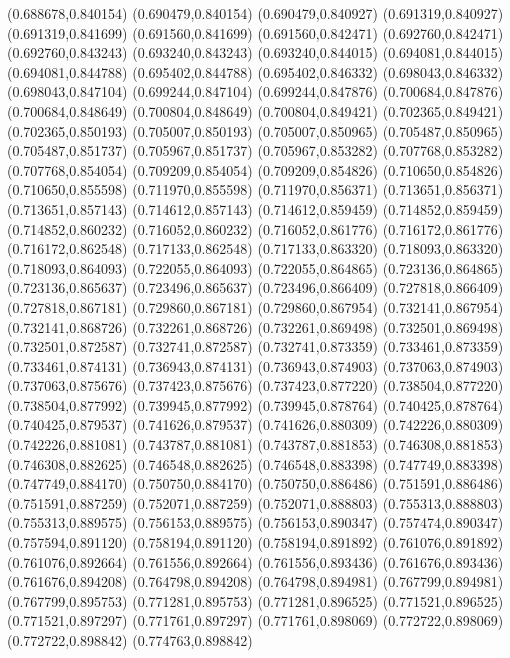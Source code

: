 (0.688678,0.840154)
(0.690479,0.840154)
(0.690479,0.840927)
(0.691319,0.840927)
(0.691319,0.841699)
(0.691560,0.841699)
(0.691560,0.842471)
(0.692760,0.842471)
(0.692760,0.843243)
(0.693240,0.843243)
(0.693240,0.844015)
(0.694081,0.844015)
(0.694081,0.844788)
(0.695402,0.844788)
(0.695402,0.846332)
(0.698043,0.846332)
(0.698043,0.847104)
(0.699244,0.847104)
(0.699244,0.847876)
(0.700684,0.847876)
(0.700684,0.848649)
(0.700804,0.848649)
(0.700804,0.849421)
(0.702365,0.849421)
(0.702365,0.850193)
(0.705007,0.850193)
(0.705007,0.850965)
(0.705487,0.850965)
(0.705487,0.851737)
(0.705967,0.851737)
(0.705967,0.853282)
(0.707768,0.853282)
(0.707768,0.854054)
(0.709209,0.854054)
(0.709209,0.854826)
(0.710650,0.854826)
(0.710650,0.855598)
(0.711970,0.855598)
(0.711970,0.856371)
(0.713651,0.856371)
(0.713651,0.857143)
(0.714612,0.857143)
(0.714612,0.859459)
(0.714852,0.859459)
(0.714852,0.860232)
(0.716052,0.860232)
(0.716052,0.861776)
(0.716172,0.861776)
(0.716172,0.862548)
(0.717133,0.862548)
(0.717133,0.863320)
(0.718093,0.863320)
(0.718093,0.864093)
(0.722055,0.864093)
(0.722055,0.864865)
(0.723136,0.864865)
(0.723136,0.865637)
(0.723496,0.865637)
(0.723496,0.866409)
(0.727818,0.866409)
(0.727818,0.867181)
(0.729860,0.867181)
(0.729860,0.867954)
(0.732141,0.867954)
(0.732141,0.868726)
(0.732261,0.868726)
(0.732261,0.869498)
(0.732501,0.869498)
(0.732501,0.872587)
(0.732741,0.872587)
(0.732741,0.873359)
(0.733461,0.873359)
(0.733461,0.874131)
(0.736943,0.874131)
(0.736943,0.874903)
(0.737063,0.874903)
(0.737063,0.875676)
(0.737423,0.875676)
(0.737423,0.877220)
(0.738504,0.877220)
(0.738504,0.877992)
(0.739945,0.877992)
(0.739945,0.878764)
(0.740425,0.878764)
(0.740425,0.879537)
(0.741626,0.879537)
(0.741626,0.880309)
(0.742226,0.880309)
(0.742226,0.881081)
(0.743787,0.881081)
(0.743787,0.881853)
(0.746308,0.881853)
(0.746308,0.882625)
(0.746548,0.882625)
(0.746548,0.883398)
(0.747749,0.883398)
(0.747749,0.884170)
(0.750750,0.884170)
(0.750750,0.886486)
(0.751591,0.886486)
(0.751591,0.887259)
(0.752071,0.887259)
(0.752071,0.888803)
(0.755313,0.888803)
(0.755313,0.889575)
(0.756153,0.889575)
(0.756153,0.890347)
(0.757474,0.890347)
(0.757594,0.891120)
(0.758194,0.891120)
(0.758194,0.891892)
(0.761076,0.891892)
(0.761076,0.892664)
(0.761556,0.892664)
(0.761556,0.893436)
(0.761676,0.893436)
(0.761676,0.894208)
(0.764798,0.894208)
(0.764798,0.894981)
(0.767799,0.894981)
(0.767799,0.895753)
(0.771281,0.895753)
(0.771281,0.896525)
(0.771521,0.896525)
(0.771521,0.897297)
(0.771761,0.897297)
(0.771761,0.898069)
(0.772722,0.898069)
(0.772722,0.898842)
(0.774763,0.898842)
